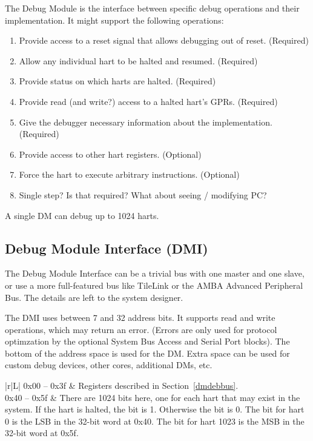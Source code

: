 \documentclass{article}
\newenvironment{steps}[1]
{
   \vspace{1ex}
   \noindent
   #1
   \begin{enumerate}[nosep]
}
{
   \end{enumerate}
   \vspace{1ex}
}
\begin{document}
\begin{steps}{The Debug Module is the interface between specific debug
    operations and their implementation. It might support the following
    operations:}
\item Provide access to a reset signal that allows debugging out of reset.
    (Required)
\item Allow any individual hart to be halted and resumed. (Required)
\item Provide status on which harts are halted. (Required)
\item Provide read (and write?) access to a halted hart's GPRs. (Required)
\item Give the debugger necessary information about the implementation. (Required)
\item Provide access to other hart registers. (Optional)
\item Force the hart to execute arbitrary instructions. (Optional)
\item Single step? Is that required? What about seeing / modifying PC?
\end{steps}

A single DM can debug up to 1024 harts.

\subsection{Debug Module Interface (DMI)} \label{dmi}

The Debug Module Interface can be a trivial bus with one master and one slave,
or use a more full-featured bus like TileLink or the AMBA Advanced Peripheral
Bus. The details are left to the system designer.

The DMI uses between 7 and 32 address bits.  It supports read and write
operations, which may return an error. (Errors are only used for protocol
optimzation by the optional
System Bus Access and Serial Port blocks).
The bottom of the address space is
used for the DM. Extra space can be used for custom debug devices, other cores,
additional DMs, etc.

\begin{table}[htp]
    \centering
    \caption{Debug Module Interface Address Space}
    \label{tab:header}
    \begin{tabulary}{\textwidth}{|r|L|}
        \hline
        0x00 -- 0x3f & Registers described in Section~\ref{dmdebbus}. \\
        \hline
        0x40 -- 0x5f & There are 1024 bits here, one for each hart that may
        exist in the system. If the hart is halted, the bit is 1.  Otherwise
        the bit is 0. The bit for hart 0 is the LSB in the 32-bit word at 0x40.
        The bit for hart 1023 is the MSB in the 32-bit word at 0x5f. \\
        \hline
    \end{tabulary}
\end{table}
\end{document}
